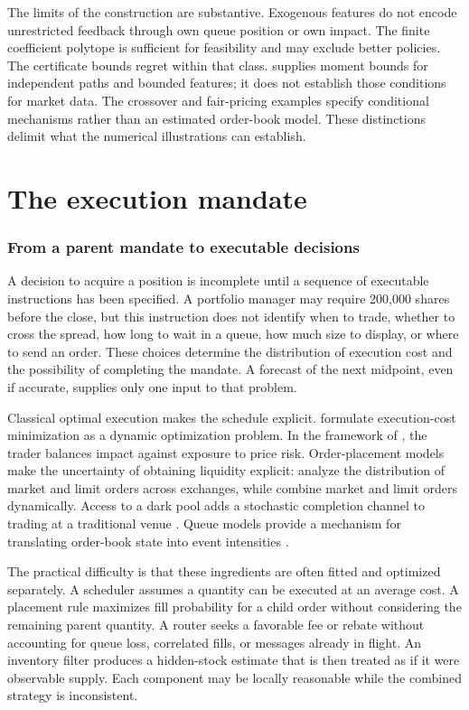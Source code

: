 \documentclass[11pt]{article}
\numberwithin{equation}{section}
\theoremstyle{definition}
\theoremstyle{remark}
\theoremstyle{definition}
\begin{document}
The limits of the construction are substantive. Exogenous features do not
encode unrestricted feedback through own queue position or own impact. The
finite coefficient polytope is sufficient for feasibility and may exclude
better policies. The certificate bounds regret within that class.
 supplies moment bounds for independent paths and
bounded features; it does not establish those conditions for market data.
The crossover and fair-pricing examples specify conditional mechanisms rather
than an estimated order-book model. These distinctions delimit what the
numerical illustrations can establish.

\part{The execution mandate}\label{pt:mandate}
\section{From a parent mandate to executable decisions}\label{sec:mandate}

A decision to acquire a position is incomplete until a sequence of executable
instructions has been specified. A portfolio manager may require 200,000 shares
before the close, but this instruction does not identify when to trade, whether
to cross the spread, how long to wait in a queue, how much size to display, or
where to send an order. These choices determine the distribution of execution
cost and the possibility of completing the mandate. A forecast of the next
midpoint, even if accurate, supplies only one input to that problem.

Classical optimal execution makes the schedule explicit.
\citet{bertsimaslo1998} formulate execution-cost minimization as a dynamic
optimization problem. In the framework of
\citet{almgren2001}, the trader balances impact against exposure to price risk.
Order-placement models make the uncertainty of obtaining liquidity explicit:
\citet{cont2017} analyze the distribution of market and limit orders across
exchanges, while \citet{cartea2015} combine market and limit orders dynamically.
Access to a dark pool adds a stochastic completion channel to trading at a
traditional venue \citep{kratz2015}. Queue models provide a mechanism for
translating order-book state into event intensities \citep{huang2015}.

The practical difficulty is that these ingredients are often fitted and optimized
separately. A scheduler assumes a quantity can be executed at an average cost.
A placement rule maximizes fill probability for a child order without considering
the remaining parent quantity. A router seeks a favorable fee or rebate without
accounting for queue loss, correlated fills, or messages already in flight. An
inventory filter produces a hidden-stock estimate that is then treated as if it
were observable supply. Each component may be locally reasonable while the
combined strategy is inconsistent.
\end{document}
